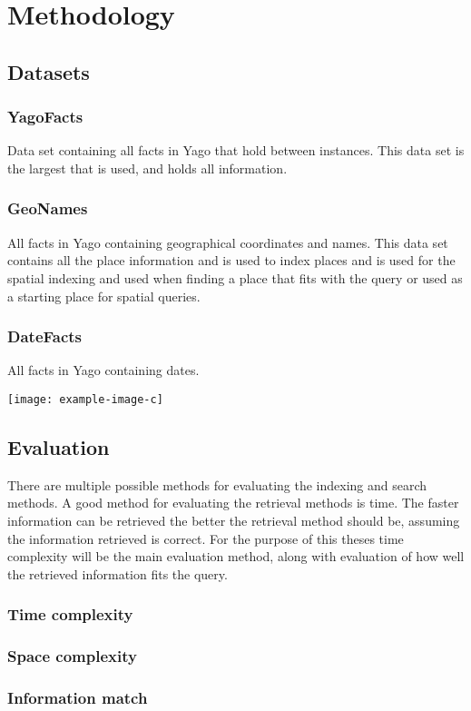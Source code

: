 
\chapter{Methodology}

\section{Datasets}
\subsection{YagoFacts}
Data set containing all facts in Yago that hold between instances. This data set is the largest that is used, and holds all information.

\subsection{GeoNames}
All facts in Yago containing geographical coordinates and names. This data set contains all the place information and is used to index places and is used for the spatial indexing and used when finding a place that fits with the query or used as a starting place for spatial queries. 

\subsection{DateFacts}
All facts in Yago containing dates.

\texttt{[image: example-image-c]}

\section{Evaluation}
There are multiple possible methods for evaluating the indexing and search methods. A good method for evaluating the retrieval methods is time. The faster information can be retrieved the better the retrieval method should be, assuming the information retrieved is correct. For the purpose of this theses time complexity will be the main evaluation method, along with evaluation of how well the retrieved information fits the query.

\subsection{Time complexity}  

\subsection{Space complexity}

\subsection{Information match}

\clearpage